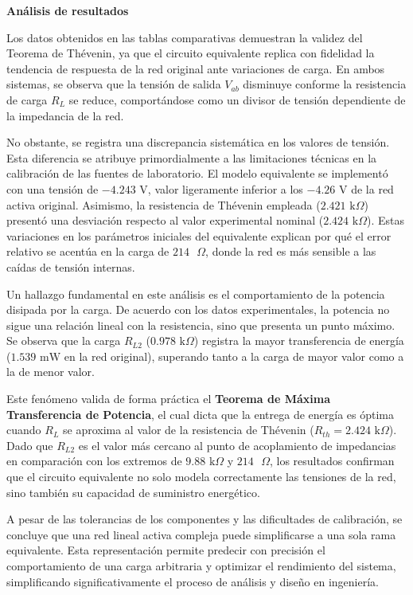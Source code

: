 \textbf{Análisis de resultados}

Los datos obtenidos en las tablas comparativas demuestran la validez del Teorema de Thévenin, ya que el circuito equivalente replica con fidelidad la tendencia de respuesta de la red original ante variaciones de carga. En ambos sistemas, se observa que la tensión de salida $V_{ab}$ disminuye conforme la resistencia de carga $R_L$ se reduce, comportándose como un divisor de tensión dependiente de la impedancia de la red.

No obstante, se registra una discrepancia sistemática en los valores de tensión. Esta diferencia se atribuye primordialmente a las limitaciones técnicas en la calibración de las fuentes de laboratorio. El modelo equivalente se implementó con una tensión de $-4.243 \text{ V}$, valor ligeramente inferior a los $-4.26 \text{ V}$ de la red activa original. Asimismo, la resistencia de Thévenin empleada ($2.421 \text{ k}\Omega$) presentó una desviación respecto al valor experimental nominal ($2.424 \text{ k}\Omega$). Estas variaciones en los parámetros iniciales del equivalente explican por qué el error relativo se acentúa en la carga de $214 \text{ }\Omega$, donde la red es más sensible a las caídas de tensión internas.

Un hallazgo fundamental en este análisis es el comportamiento de la potencia disipada por la carga. De acuerdo con los datos experimentales, la potencia no sigue una relación lineal con la resistencia, sino que presenta un punto máximo. Se observa que la carga $R_{L2}$ ($0.978 \text{ k}\Omega$) registra la mayor transferencia de energía ($1.539 \text{ mW}$ en la red original), superando tanto a la carga de mayor valor como a la de menor valor. 

Este fenómeno valida de forma práctica el \textbf{Teorema de Máxima Transferencia de Potencia}, el cual dicta que la entrega de energía es óptima cuando $R_L$ se aproxima al valor de la resistencia de Thévenin ($R_{th} = 2.424 \text{ k}\Omega$). Dado que $R_{L2}$ es el valor más cercano al punto de acoplamiento de impedancias en comparación con los extremos de $9.88 \text{ k}\Omega$ y $214 \text{ }\Omega$, los resultados confirman que el circuito equivalente no solo modela correctamente las tensiones de la red, sino también su capacidad de suministro energético.

A pesar de las tolerancias de los componentes y las dificultades de calibración, se concluye que una red lineal activa compleja puede simplificarse a una sola rama equivalente. Esta representación permite predecir con precisión el comportamiento de una carga arbitraria y optimizar el rendimiento del sistema, simplificando significativamente el proceso de análisis y diseño en ingeniería.
